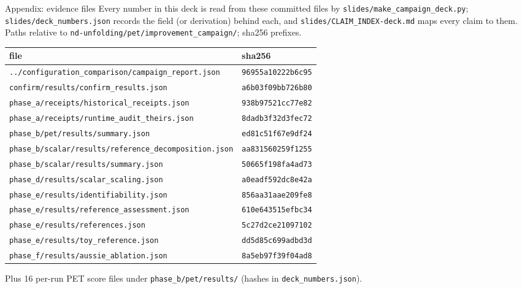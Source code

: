 \documentclass[aspectratio=169,10pt]{beamer}
\def\evidencetext{}
\begin{document}
\gdef\evidencetext{\texttt{slides/deck\_numbers.json}}
\begin{frame}{Appendix: evidence files}
{\small Every number in this deck is read from these committed files by
\texttt{slides/make\_campaign\_deck.py}; \texttt{slides/deck\_numbers.json} records the field (or derivation)
behind each, and \texttt{slides/CLAIM\_INDEX-deck.md} maps every claim to them. Paths relative to
\texttt{nd-unfolding/pet/improvement\_campaign/}; sha256 prefixes.}
\begin{center}
{\tiny
\begin{tabular}{ll}
\toprule
file & sha256 \\
\midrule
\texttt{../configuration\_comparison/campaign\_report.json} & \texttt{96955a10222b6c95} \\
\texttt{confirm/results/confirm\_results.json} & \texttt{a6b03f09bb726b80} \\
\texttt{phase\_a/receipts/historical\_receipts.json} & \texttt{938b97521cc77e82} \\
\texttt{phase\_a/receipts/runtime\_audit\_theirs.json} & \texttt{8dadb3f32d3fec72} \\
\texttt{phase\_b/pet/results/summary.json} & \texttt{ed81c51f67e9df24} \\
\texttt{phase\_b/scalar/results/reference\_decomposition.json} & \texttt{aa831560259f1255} \\
\texttt{phase\_b/scalar/results/summary.json} & \texttt{50665f198fa4ad73} \\
\texttt{phase\_d/results/scalar\_scaling.json} & \texttt{a0eadf592dc8e42a} \\
\texttt{phase\_e/results/identifiability.json} & \texttt{856aa31aae209fe8} \\
\texttt{phase\_e/results/reference\_assessment.json} & \texttt{610e643515efbc34} \\
\texttt{phase\_e/results/references.json} & \texttt{5c27d2ce21097102} \\
\texttt{phase\_e/results/toy\_reference.json} & \texttt{dd5d85c699adbd3d} \\
\texttt{phase\_f/results/aussie\_ablation.json} & \texttt{8a5eb97f39f04ad8} \\
\bottomrule
\end{tabular}}
\end{center}
{\tiny Plus 16 per-run PET score files under \texttt{phase\_b/pet/results/} (hashes in
\texttt{deck\_numbers.json}).}
\end{frame}
\end{document}
